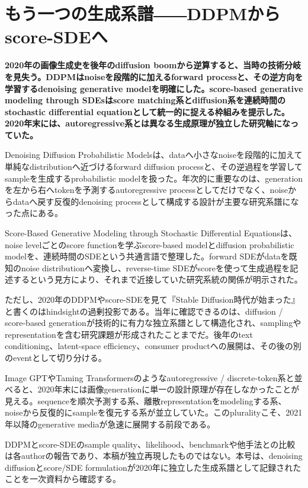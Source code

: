 \section{もう一つの生成系譜――DDPMからscore-SDEへ}
\label{pkg:diffusion-score}
\noindent\textbf{2020年の画像生成史を後年のdiffusion boomから逆算すると、当時の技術分岐を見失う。DDPMはnoiseを段階的に加えるforward processと、その逆方向を学習するdenoising generative modelを明確にした。score-based generative modeling through SDEsはscore matching系とdiffusion系を連続時間のstochastic differential equationとして統一的に捉える枠組みを提示した。2020年末には、autoregressive系とは異なる生成原理が独立した研究軸になっていた。}\autocite{src-c012a248ff78,src-d6e451e5085e}

Denoising Diffusion Probabilistic Modelsは、dataへ小さなnoiseを段階的に加えて単純なdistributionへ近づけるforward diffusion processと、その逆過程を学習してsampleを生成するprobabilistic modelを扱った。年次的に重要なのは、generationを左から右へtokenを予測するautoregressive processとしてだけでなく、noiseからdataへ戻す反復的denoising processとして構成する設計が主要な研究系譜になった点にある。\autocite{src-d6e451e5085e}


Score-Based Generative Modeling through Stochastic Differential Equationsは、noise levelごとのscore functionを学ぶscore-based modelとdiffusion probabilistic modelを、連続時間のSDEという共通言語で整理した。forward SDEがdataを既知のnoise distributionへ変換し、reverse-time SDEがscoreを使って生成過程を記述するという見方により、それまで近接していた研究系統の関係が明示された。\autocite{src-c012a248ff78}


ただし、2020年のDDPMやscore-SDEを見て『Stable Diffusion時代が始まった』と書くのはhindsightの過剰投影である。当年に確認できるのは、diffusion / score-based generationが技術的に有力な独立系譜として構造化され、samplingやrepresentationを含む研究課題が形成されたことまでだ。後年のtext conditioning、latent-space efficiency、consumer productへの展開は、その後の別のeventとして切り分ける。\autocite{src-c012a248ff78,src-d6e451e5085e}


Image GPTやTaming Transformersのようなautoregressive / discrete-token系と並べると、2020年末には画像generationに単一の設計原理が存在しなかったことが見える。sequenceを順次予測する系、離散representationをmodelingする系、noiseから反復的にsampleを復元する系が並立していた。このpluralityこそ、2021年以降のgenerative mediaが急速に展開する前段である。\autocite{src-c012a248ff78,src-d6e451e5085e}


\begin{claimboundary}
DDPMとscore-SDEのsample quality、likelihood、benchmarkや他手法との比較は各authorの報告であり、本稿が独立再現したものではない。本号は、denoising diffusionとscore/SDE formulationが2020年に独立した生成系譜として記録されたことを一次資料から確認する。\autocite{src-c012a248ff78,src-d6e451e5085e}
\end{claimboundary}
